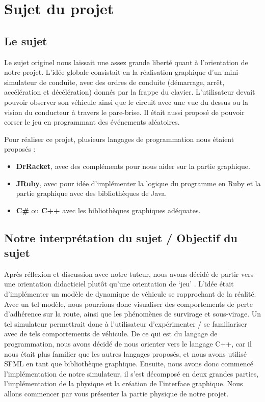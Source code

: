 \section{Sujet du projet}\label{sec:sujet-du-projet}
\subsection{Le sujet}\label{subsec:le-sujet}
Le sujet originel nous laissait une assez grande liberté quant à l'orientation de notre projet.
L'idée globale consistait en la réalisation graphique d'un mini-simulateur de conduite, avec des ordres de conduite (démarrage, arrêt, accélération et décélération) donnés par la frappe du clavier.
L'utilisateur devait pouvoir observer son véhicule ainsi que le circuit avec une vue du dessus ou la vision du conducteur à travers le pare-brise.
Il était aussi proposé de pouvoir \og corser\fg{} le jeu en programmant des événements aléatoires.

Pour réaliser ce projet, plusieurs langages de programmation nous étaient proposés :
\begin{itemize}
    \item \textbf{DrRacket}, avec des compléments pour nous aider sur la partie graphique.
    \item \textbf{JRuby}, avec pour idée d'implémenter la logique du programme en Ruby et la partie graphique avec des bibliothèques de Java.
    \item \textbf{C\#} ou \textbf{C++} avec les bibliothèques graphiques adéquates.
\end{itemize}


\subsection{Notre interprétation du sujet / Objectif du sujet}\label{subsec:notre-interpretation-du-sujet-/-objectif-du-sujet}
Après réflexion et discussion avec notre tuteur, nous avons décidé de partir vers une orientation didacticiel plutôt qu'une \og orientation de `jeu' \fg{}.
L'idée était d'implémenter un modèle de dynamique de véhicule se rapprochant de la réalité.
Avec un tel modèle, nous pourrions donc visualiser des comportements de perte d'adhérence sur la route, ainsi que les phénomènes de survirage et sous-virage.
Un tel simulateur permettrait donc à l'utilisateur d'expérimenter / se familiariser avec de tels comportements de véhicule.
De ce qui est du langage de programmation, nous avons décidé de nous orienter vers le langage C++, car il nous était plus familier que les autres langages proposés, et nous avons utilisé SFML en tant que bibliothèque graphique.
Ensuite, nous avons donc commencé l'implémentation de notre simulateur, il s'est décomposé en deux grandes parties, l'implémentation de la physique et la création de l'interface graphique.
Nous allons commencer par vous présenter la partie physique de notre projet.

\newpage